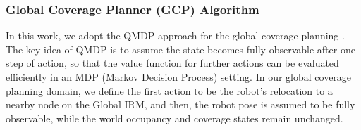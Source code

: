 \documentclass[letterpaper]{article} %
\newcommand{\phdone}[1]{} %
\begin{document}
\subsubsection{Global Coverage Planner (GCP) Algorithm} \hfill

\noindent
In this work, we adopt the QMDP approach for the global coverage planning \cite{littman1995learning}.
The key idea of QMDP is to assume the state becomes fully observable after one step of action, so that the value function for further actions can be evaluated efficiently in an MDP (Markov Decision Process) setting.
In our global coverage planning domain, we define the first action to be the robot's relocation to a nearby node on the Global IRM, and then, the robot pose is assumed to be fully observable, while the world occupancy and coverage states remain unchanged.
\end{document}
